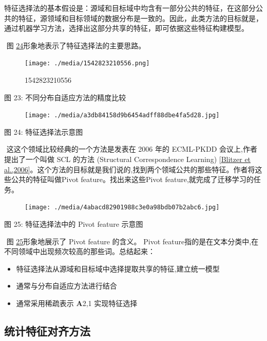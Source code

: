 ​
特征选择法的基本假设是：源域和目标域中均含有一部分公共的特征，在这部分公共的特征，源领域和目标领域的数据分布是一致的。因此，此类方法的目标就是，通过机器学习方法，选择出这部分共享的特征，即可依据这些特征构建模型。

​ 图
\protect\hyperlink{bookmark122}{24}形象地表示了特征选择法的主要思路。

\begin{figure}
\centering
\texttt{[image: ./media/1542823210556.png]}
\caption{1542823210556}
\end{figure}

图 23: 不同分布自适应方法的精度比较

\begin{figure}
\centering
\texttt{[image: ./media/a3db84158d9b6454adff88dbe4fa5d28.jpg]}
\caption{}
\end{figure}

图 24: 特征选择法示意图

​ 这这个领域比较经典的一个方法是发表在 2006 年的 ECML-PKDD
会议上,作者提出了一个叫做 SCL 的方法 (Structural Correspondence
Learning) {[}\protect\hyperlink{bookmark235}{Blitzer et
al.,2006}{]}。这个方法的目标就是我们说的,找到两个领域公共的那些特征。作者将这些公共的特征叫做Pivot
feature。找出来这些Pivot feature,就完成了迁移学习的任务。

\begin{figure}
\centering
\texttt{[image: ./media/4abacd82901988c3e0a98bdb07b2abc6.jpg]}
\caption{}
\end{figure}

图 25: 特征选择法中的 Pivot feature 示意图

​ 图 \protect\hyperlink{bookmark124}{25}形象地展示了 Pivot feature
的含义。 Pivot
feature指的是在文本分类中,在不同领域中出现频次较高的那些词。总结起来：

\begin{itemize}
\tightlist
\item
  特征选择法从源域和目标域中选择提取共享的特征,建立统一模型
\item
  通常与分布自适应方法进行结合
\item
  通常采用稀疏表示 \textbar{}\textbar{}\textbf{A}\textbar{}\textbar{}2,1
  实现特征选择
\end{itemize}

\subsection{统计特征对齐方法}\label{ux7edfux8ba1ux7279ux5f81ux5bf9ux9f50ux65b9ux6cd5}

